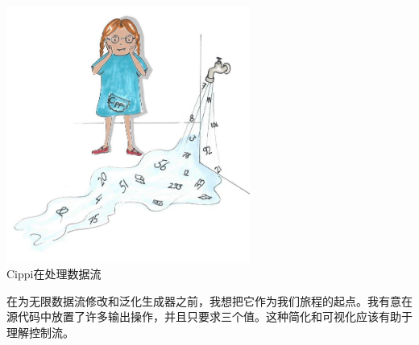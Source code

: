 \begin{center}
\includegraphics[width=0.6\textwidth]{content/3/chapter7/images/13.png}\\
Cippi在处理数据流
\end{center}

在为无限数据流修改和泛化生成器之前，我想把它作为我们旅程的起点。我有意在源代码中放置了许多输出操作，并且只要求三个值。这种简化和可视化应该有助于理解控制流。

